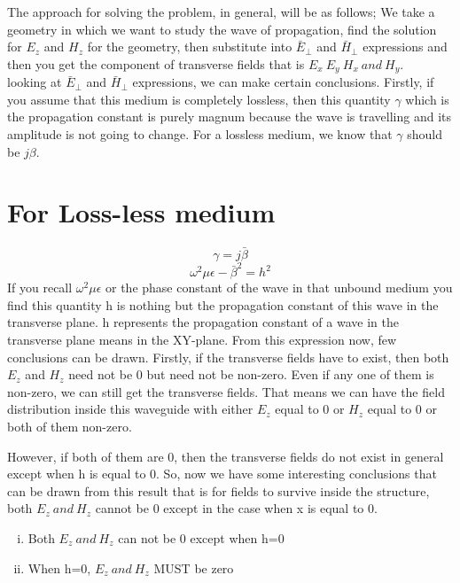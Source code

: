 The approach for solving the problem, in general, will be as follows; We take a geometry in which we want to study the wave of propagation, find the solution for $E_z$ and $H_z$ for the geometry, then substitute into $\bar{E}_\bot$ and $\bar{H}_\bot$ expressions and then you get the component of transverse fields that is $E_x\ E_y\ H_x\ and\ H_y$.\\looking at $\bar{E}_\bot$ and $\bar{H}_\bot$ expressions, we can make certain conclusions. Firstly, if you assume that this medium is completely lossless, then this quantity $\gamma$ which is the propagation constant is purely magnum because the wave is travelling and its amplitude is not going to change. For a lossless medium, we know that $\gamma$ should be $j\beta$.
\section{For Loss-less medium}
\begin{equation*}
\gamma = j\bar{\beta}
\end{equation*}
\begin{equation*}
\omega^2\mu\epsilon - \bar{\beta}^2 = h^2
\end{equation*}
If you recall $\omega^2\mu\epsilon$ or the phase constant of the wave in that unbound medium you find this quantity h is nothing but the propagation constant of this wave in the transverse plane. h represents the propagation constant of a wave in the transverse plane means in the XY-plane. From this expression now, few conclusions can be drawn. Firstly, if the transverse fields have to exist, then both $E_z$ and $H_z$ need not be 0 but need not be non-zero. Even if any one of them is non-zero, we can still get the transverse fields. That means we can have the field distribution inside this waveguide with either $E_z$ equal to 0 or $H_z$ equal to 0 or both of them non-zero.

However, if both of them are 0, then the transverse fields do not exist in general except when h is equal to 0. So, now we have some interesting conclusions that can be drawn from this result that is for fields to survive inside the structure, both $E_z\ and\ H_z$ cannot be 0 except in the case when x is equal to 0.
\begin{enumerate}[(i)]
\item Both $E_z\ and\ H_z$ can not be 0 except when h=0
\item When h=0, $E_z\ and\ H_z$ MUST be zero
\end{enumerate}

